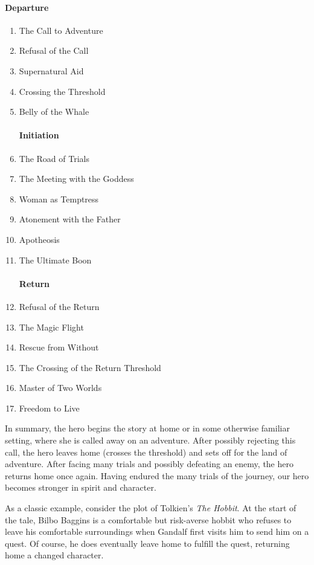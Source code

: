 \paragraph{Departure}
\begin{enumerate}
  \item The Call to Adventure
  \item Refusal of the Call
  \item Supernatural Aid
  \item Crossing the Threshold
  \item Belly of the Whale

\paragraph{Initiation}
  \item The Road of Trials
  \item The Meeting with the Goddess
  \item Woman as Temptress
  \item Atonement with the Father
  \item Apotheosis
  \item The Ultimate Boon
\paragraph{Return}
  \item Refusal of the Return
  \item The Magic Flight
  \item Rescue from Without
  \item The Crossing of the Return Threshold
  \item Master of Two Worlds
  \item Freedom to Live
\end{enumerate}

In summary, the hero begins the story at home or in some otherwise familiar
setting, where she is called away on an adventure. After possibly rejecting this
call, the hero leaves home (crosses the threshold) and sets off for the land of adventure. After facing
many trials and possibly defeating an enemy, the hero returns home once again.
Having endured the many trials of the journey, our hero becomes stronger in spirit
and character.

As a classic example, consider the plot of Tolkien's \emph{The Hobbit}. At the
start of the tale, Bilbo Baggins is a comfortable but risk-averse hobbit who
refuses to leave his comfortable surroundings when Gandalf first visits him to
send him on a quest. Of course, he does eventually leave home to fulfill the
quest, returning home a changed character.

